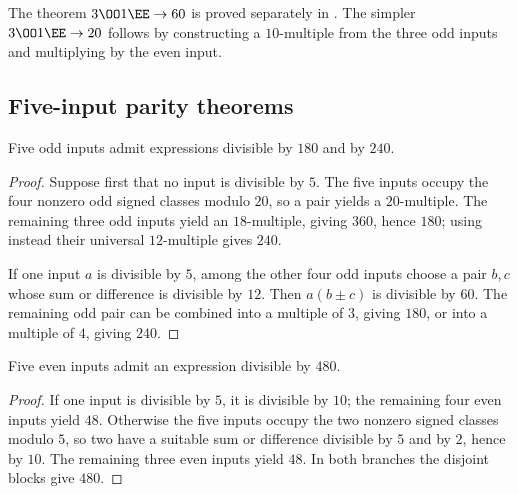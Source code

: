 The theorem $3\OO1\EE\to60$ is proved separately in
.  The simpler $3\OO1\EE\to20$ follows by constructing a
$10$-multiple from the three odd inputs and multiplying by the even input.

\subsection{Five-input parity theorems}

\begin{theorem}\label{app:fiveodd}
Five odd inputs admit expressions divisible by $180$ and by $240$.
\end{theorem}
\begin{proof}
Suppose first that no input is divisible by $5$.  The five inputs occupy the
four nonzero odd signed classes modulo $20$, so a pair yields a $20$-multiple.
The remaining three odd inputs yield an $18$-multiple, giving $360$, hence
$180$; using instead their universal $12$-multiple gives $240$.

If one input $a$ is divisible by $5$, among the other four odd inputs choose
a pair $b,c$ whose sum or difference is divisible by $12$.  Then
$a(b\pm c)$ is divisible by $60$.  The remaining odd pair can be combined
into a multiple of $3$, giving $180$, or into a multiple of $4$, giving
$240$.
\end{proof}

\begin{theorem}\label{app:fiveeven}
Five even inputs admit an expression divisible by $480$.
\end{theorem}
\begin{proof}
If one input is divisible by $5$, it is divisible by $10$; the remaining
four even inputs yield $48$.  Otherwise the five inputs occupy the two
nonzero signed classes modulo $5$, so two have a suitable sum or difference
divisible by $5$ and by $2$, hence by $10$.  The remaining three even inputs
yield $48$.  In both branches the disjoint blocks give $480$.
\end{proof}
